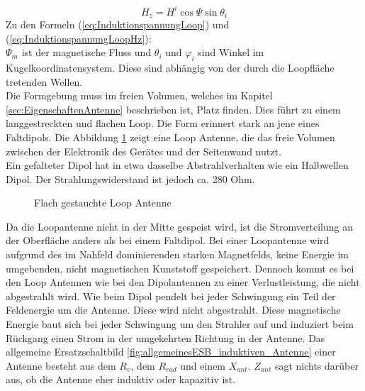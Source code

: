 \begin{equation}\label{eq:InduktionspannungLoopHz}
H_{z}=H^{i}\cos\Psi\sin\theta_{i}
\end{equation}
Zu den Formeln (\ref{eq:InduktionspannungLoop}) und (\ref{eq:InduktionspannungLoopHz}): \\
$\Psi_{m}$ ist der magnetische Fluss und $\theta_{i}$ und $\varphi_{i}$  sind  Winkel im Kugelkoordinatensystem. Diese sind  abhängig von der durch die Loopfläche tretenden Wellen.\\ 
Die Formgebung muss im freien Volumen, welches im Kapitel \ref{sec:EigenschaftenAntenne} beschrieben ist, Platz finden. Dies führt zu einem langgestreckten und flachen Loop. Die Form erinnert stark an jene eines Faltdipols. Die Abbildung \ref{fig:FflacheLoopAntenne} zeigt eine Loop Antenne, die das freie Volumen zwischen der Elektronik des Gerätes und der Seitenwand nutzt.\\
Ein gefalteter Dipol hat in etwa dasselbe Abstrahlverhalten wie ein Halbwellen Dipol. Der Strahlungswiderstand ist jedoch  ca.  280 Ohm. 

\begin{figure}[!ht]
	\begin{center}
	\end{center}
\caption{Flach gestauchte Loop Antenne}
\label{fig:FflacheLoopAntenne}
\end{figure}

Da  die Loopantenne nicht in der Mitte gespeist wird, ist die Stromverteilung an der Oberfläche anders als bei einem Faltdipol. Bei einer Loopantenne wird aufgrund des im Nahfeld dominierenden starken Magnetfelds, keine Energie im umgebenden, nicht magnetischen  Kunststoff gespeichert. Dennoch kommt es bei den Loop Antennen wie bei den Dipolantennen zu einer Verlustleistung, die nicht abgestrahlt wird. Wie beim Dipol pendelt bei jeder Schwingung ein Teil der Feldenergie um die Antenne. Diese wird nicht abgestrahlt. Diese magnetische Energie baut sich bei jeder Schwingung um den Strahler auf und induziert beim Rückgang einen Strom in der umgekehrten Richtung in der Antenne. Das allgemeine Ersatzschaltbild \ref{fig:allgemeinesESB_induktiven_Antenne} einer Antenne besteht aus dem $R_{v}$, dem $R_{rad}$ und einem $X_{ant}$. $Z_{ant}$ sagt nichts darüber aus, ob die Antenne eher induktiv oder kapazitiv ist.



